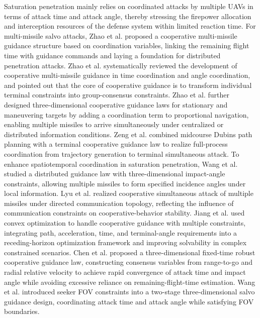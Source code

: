 \documentclass{cja}
\begin{document}
Saturation penetration mainly relies on coordinated attacks by multiple UAVs in terms of attack time and attack angle, thereby stressing the firepower allocation and interception resources of the defense system within limited reaction time. For multi-missile salvo attacks, Zhao et al.\cite{ZhaoZhou2008AAS} proposed a cooperative multi-missile guidance structure based on coordination variables, linking the remaining flight time with guidance commands and laying a foundation for distributed penetration attacks. Zhao et al.\cite{ZhaoYang2017AAS} systematically reviewed the development of cooperative multi-missile guidance in time coordination and angle coordination, and pointed out that the core of cooperative guidance is to transform individual terminal constraints into group-consensus constraints. Zhao et al.\cite{Zhao2015CJA} further designed three-dimensional cooperative guidance laws for stationary and maneuvering targets by adding a coordination term to proportional navigation, enabling multiple missiles to arrive simultaneously under centralized or distributed information conditions. Zeng et al.\cite{Zeng2018CJA} combined midcourse Dubins path planning with a terminal cooperative guidance law to realize full-process coordination from trajectory generation to terminal simultaneous attack. To enhance spatiotemporal coordination in saturation penetration, Wang et al.\cite{WangLu2018ISA} studied a distributed guidance law with three-dimensional impact-angle constraints, allowing multiple missiles to form specified incidence angles under local information. Lyu et al.\cite{Lyu2019AST} realized cooperative simultaneous attack of multiple missiles under directed communication topology, reflecting the influence of communication constraints on cooperative-behavior stability. Jiang et al.\cite{Jiang2018AST} used convex optimization to handle cooperative guidance with multiple constraints, integrating path, acceleration, time, and terminal-angle requirements into a receding-horizon optimization framework and improving solvability in complex constrained scenarios. Chen et al.\cite{Chen2021AST} proposed a three-dimensional fixed-time robust cooperative guidance law, constructing consensus variables from range-to-go and radial relative velocity to achieve rapid convergence of attack time and impact angle while avoiding excessive reliance on remaining-flight-time estimation. Wang et al.\cite{Ai2019FOVSalvo} introduced seeker FOV constraints into a two-stage three-dimensional salvo guidance design, coordinating attack time and attack angle while satisfying FOV boundaries.
\end{document}
